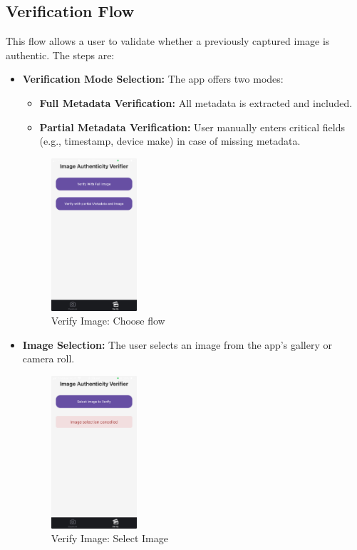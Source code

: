 \subsection{Verification Flow}
This flow allows a user to validate whether a previously captured image is authentic. The steps are:
\begin{itemize}
    \item {\textbf{Verification Mode Selection:}} The app offers two modes:
    \begin{itemize}
        \item {\textbf{Full Metadata Verification:}} All metadata is extracted and included.
        \item {\textbf{Partial Metadata Verification:}} User manually enters critical fields (e.g., timestamp, device make) in case of missing metadata.
    \end{itemize}
        \begin{figure}[H]
            \centering
            \includegraphics[width=0.30\textwidth]{images/verifyFlowRoot.jpeg}
            \caption{Verify Image: Choose flow}
            \label{fig:verificationRoot}
        \end{figure}

    \item {\textbf{Image Selection:}} The user selects an image from the app's gallery or camera roll.
        \begin{figure}[H]
            \centering
            \includegraphics[width=0.30\textwidth]{images/selectImage.jpeg}
            \caption{Verify Image: Select Image}
            \label{fig:verifySelectImage}
        \end{figure}


\end{itemize}
